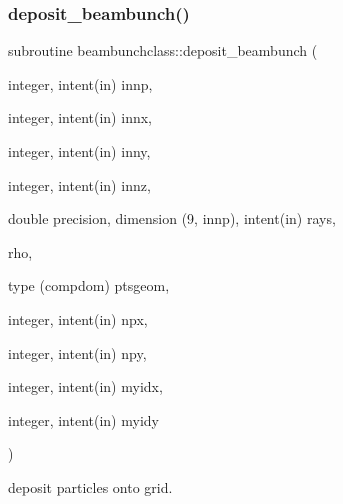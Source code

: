 \subsubsection{\texorpdfstring{deposit\_beambunch()}{deposit\_beambunch()}}
{\footnotesize\ttfamily subroutine beambunchclass\+::deposit\+\_\+beambunch (\begin{DoxyParamCaption}\item[{integer, intent(in)}]{innp,  }\item[{integer, intent(in)}]{innx,  }\item[{integer, intent(in)}]{inny,  }\item[{integer, intent(in)}]{innz,  }\item[{double precision, dimension (9, innp), intent(in)}]{rays,  }\item[{}]{rho,  }\item[{type (compdom)}]{ptsgeom,  }\item[{integer, intent(in)}]{npx,  }\item[{integer, intent(in)}]{npy,  }\item[{integer, intent(in)}]{myidx,  }\item[{integer, intent(in)}]{myidy }\end{DoxyParamCaption})}



deposit particles onto grid. 

